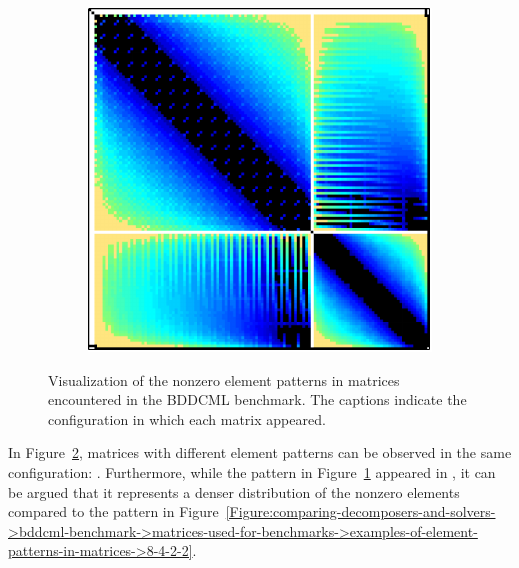 \begin{figure}[ht!]
\begin{subfigure}[b]{0.48\textwidth}
		\includegraphics[width=\textwidth]{images/ch03/input-matrices/bddcml-benchmark/poc-32_4_2.pdf}
		\caption{}
		\label{Figure:comparing-decomposers-and-solvers->bddcml-benchmark->matrices-used-for-benchmarks->examples-of-element-patterns-in-matrices->32-4-2}
	\end{subfigure}
	
	\caption{Visualization of the nonzero element patterns in matrices encountered in the BDDCML benchmark. The captions indicate the configuration in which each matrix appeared.}
	\label{Figure:comparing-decomposers-and-solvers->bddcml-benchmark->matrices-used-for-benchmarks->examples-of-element-patterns-in-matrices}
\end{figure}

In Figure~\ref{Figure:comparing-decomposers-and-solvers->bddcml-benchmark->matrices-used-for-benchmarks->examples-of-element-patterns-in-matrices}, matrices with different element patterns can be observed in the same configuration: . Furthermore, while the pattern in Figure~\ref{Figure:comparing-decomposers-and-solvers->bddcml-benchmark->matrices-used-for-benchmarks->examples-of-element-patterns-in-matrices->32-4-2} appeared in , it can be argued that it represents a denser distribution of the nonzero elements compared to the pattern in Figure~\ref{Figure:comparing-decomposers-and-solvers->bddcml-benchmark->matrices-used-for-benchmarks->examples-of-element-patterns-in-matrices->8-4-2-2}.



